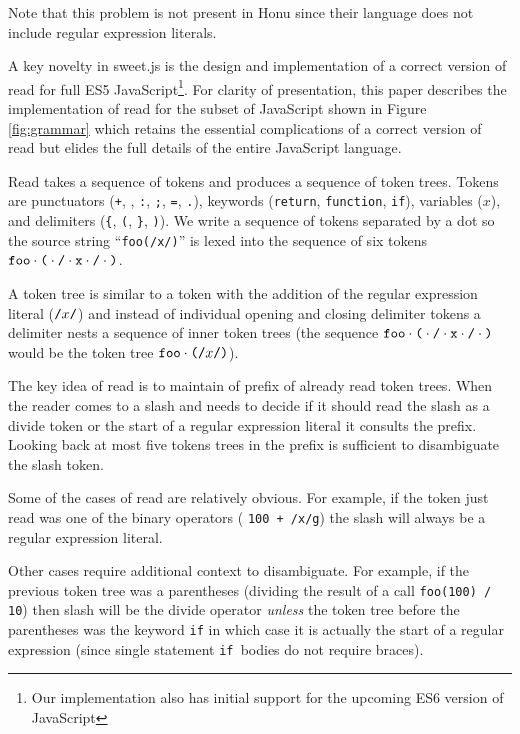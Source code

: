 \documentclass[preprint,10pt]{sigplanconf}
\begin{document}
Note that this problem is not present in Honu since their language
does not include regular expression literals.

A key novelty in sweet.js is the design and implementation of a
correct version of read for full ES5 JavaScript\footnote{Our
  implementation also has initial support for the upcoming ES6
  version of JavaScript}. 
For clarity of presentation, this paper
describes the implementation of read for the subset of JavaScript
shown in Figure \ref{fig:grammar} which retains the essential
complications of a correct version of read but elides the full details
of the entire JavaScript language.

Read takes a sequence of tokens and produces a sequence of token
trees. Tokens are punctuators (\texttt{+}, \div, \texttt{:},
\texttt{;}, \texttt{=}, \texttt{.}), keywords (\texttt{return},
\texttt{function}, \texttt{if}), variables (\( x \)), and delimiters
(\texttt{\{}, \texttt{(}, \texttt{\}}, \texttt{)}). We write a
sequence of tokens separated by a dot so the source string
``\lstinline!foo(/x/)!'' is lexed into the sequence of six tokens
\( \texttt{foo}\cdot \texttt{(} \cdot \texttt{/} \cdot \texttt{x} \cdot \texttt{/} \cdot \texttt{)} \).

A token tree is similar to a token with 
the addition of the regular
expression literal (\( \texttt{/}x\texttt{/} \)) and instead of 
individual opening and
closing delimiter tokens a delimiter nests a sequence of inner token
trees (\eg the sequence \( \texttt{foo} \cdot \texttt{(} \cdot
\texttt{/} \cdot \texttt{x} \cdot \texttt{/} \cdot \texttt{)} \) would be
the token tree \( \texttt{foo} \cdot \texttt{(}\texttt{/}x\texttt{/}\texttt{)} \)).

The key idea of read is to maintain of prefix of already read token
trees. When the reader comes to a slash and needs to decide if it
should read the slash as a divide token or the start of a regular
expression literal it consults the prefix. Looking back at most five
tokens trees in the prefix is sufficient to disambiguate the slash
token.

Some of the cases of read are relatively obvious. For example, if the
token just read was one of the binary operators (\eg
\lstinline!100 + /x/g!) the slash will always be a regular expression
literal. 

Other cases require additional context to disambiguate. For example,
if the previous token tree was a parentheses (\eg dividing the result
of a call \lstinline!foo(100) / 10!) then slash will be the divide
operator \emph{unless} the token tree before the parentheses was the
keyword \texttt{if} in which case it is actually the start of a
regular expression (since single statement \texttt{if }bodies do not require
braces).
\end{document}
